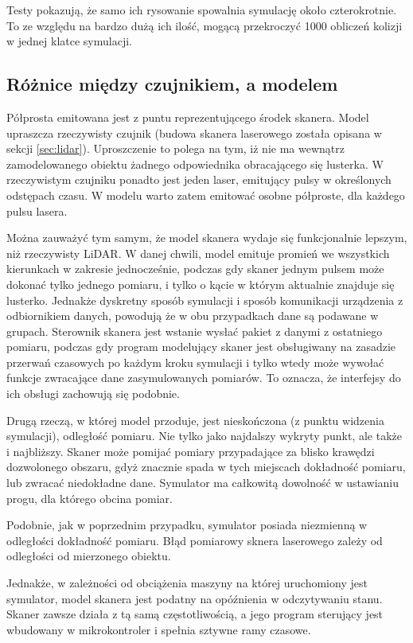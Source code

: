 		Testy pokazują, że samo ich rysowanie spowalnia symulację około czterokrotnie.
		To ze względu na bardzo dużą ich ilość, mogącą przekroczyć 1000 obliczeń kolizji w jednej klatce symulacji.

	\subsection{Różnice między czujnikiem, a modelem}
		Półprosta emitowana jest z puntu reprezentującego środek skanera.
		Model upraszcza rzeczywisty czujnik (budowa skanera laserowego została opisana w sekcji \ref{sec:lidar}).
		Uproszczenie to polega na tym, iż nie ma wewnątrz zamodelowanego obiektu żadnego odpowiednika obracającego się lusterka.
		W rzeczywistym czujniku ponadto jest jeden laser, emitujący pulsy w określonych odstępach czasu.
		W modelu warto zatem emitować osobne półproste, dla każdego pulsu lasera.

		Można zauważyć tym samym, że model skanera wydaje się funkcjonalnie lepszym, niż rzeczywisty LiDAR.
		W danej chwili, model emituje promień we wszystkich kierunkach w zakresie jednocześnie, podczas gdy skaner jednym pulsem może dokonać tylko jednego pomiaru,
		i tylko o kącie w którym aktualnie znajduje się lusterko.
		Jednakże dyskretny sposób symulacji i sposób komunikacji urządzenia z odbiornikiem danych, powodują że w obu przypadkach dane są podawane w grupach.
		Sterownik skanera jest wstanie wysłać pakiet z danymi z ostatniego pomiaru, podczas gdy program modelujący skaner jest obsługiwany na zasadzie przerwań czasowych 
		po każdym kroku symulacji i tylko wtedy może wywołać funkcje zwracające dane zasymulowanych pomiarów.
		To oznacza, że interfejsy do ich obsługi zachowują się podobnie.

		Drugą rzeczą, w której model przoduje, jest nieskończona (z punktu widzenia symulacji), odległość pomiaru.
		Nie tylko jako najdalszy wykryty punkt, ale także i najbliższy. 
		Skaner może pomijać pomiary przypadające za blisko krawędzi dozwolonego obszaru, gdyż znacznie spada w tych miejscach dokładność pomiaru, lub zwracać niedokładne dane.
		Symulator ma całkowitą dowolność w ustawianiu progu, dla którego obcina pomiar.

		Podobnie, jak w poprzednim przypadku, symulator posiada niezmienną w odległości dokładność pomiaru.
		Błąd pomiarowy sknera laserowego zależy od odległości od mierzonego obiektu.

		Jednakże, w zależności od obciążenia maszyny na której uruchomiony jest symulator, model skanera jest podatny na opóźnienia w odczytywaniu stanu.
		Skaner zawsze działa z tą samą częstotliwością, a jego program sterujący jest wbudowany w mikrokontroler i spełnia sztywne ramy czasowe.

